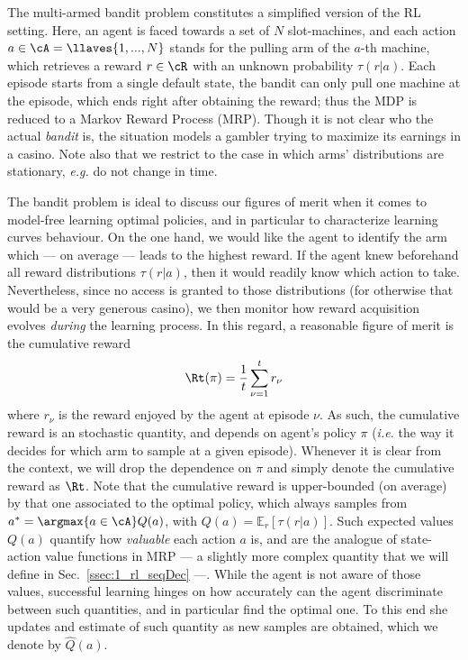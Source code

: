 The multi-armed bandit problem constitutes a simplified version of the RL setting. Here, an agent is faced towards a set of $N$ slot-machines, and each action $a \in \cA= \llaves{1,...,N}$ stands for the pulling arm of the $a$-th machine, which retrieves a reward $r \in \cR$ with an unknown probability $\tau(r|a)$. Each episode starts from a single default state, the bandit can only pull one machine at the episode, which ends right after obtaining the reward; thus the MDP is reduced to a Markov Reward Process (MRP). Though it is not clear who the actual \textit{bandit} is, the situation models a gambler trying to maximize its earnings in a casino. Note also that we restrict to the case in which arms' distributions are stationary, \textit{e.g.} do not change in time.

The bandit problem is ideal to discuss our figures of merit when it comes to model-free learning optimal policies, and in particular to characterize learning curves behaviour. On the one hand, we would like the agent to identify the arm which --- on average --- leads to the highest reward. If the agent knew beforehand all reward distributions $\tau(r|a)$, then it would readily know which action to take. Nevertheless, since no access is granted to those distributions (for otherwise that would be a very generous casino), we then monitor how reward acquisition evolves \textit{during} the learning process. In this regard, a reasonable figure of merit is the cumulative reward
\begin{align}
\Rt(\pi) = \frac{1}{t}\sum_{\nu=1}^t r_\nu
\end{align}
where $r_\nu$ is the reward enjoyed by the agent at episode $\nu$. As such, the cumulative reward is an stochastic quantity, and depends on agent's policy $\pi$ (\textit{i.e.} the way it decides for which arm to sample at a given episode). Whenever it is clear from the context, we will drop the dependence on $\pi$ and simply denote the cumulative reward as $\Rt$. Note that the cumulative reward is upper-bounded (on average) by that one associated to the optimal policy, which always samples from $a^* = \argmax{a\in\cA}Q(a)$, with $Q(a) = \mathbb{E}_r[\tau(r|a)]$. Such expected values $Q(a)$ quantify how \textit{valuable} each action $a$ is, and are the analogue of state-action value functions in MRP --- a slightly more complex quantity that we will define in Sec.~\ref{ssec:1_rl_seqDec} ---. While the agent is not aware of those values, successful learning hinges on how accurately can the agent discriminate between such quantities, and in particular find the optimal one. To this end she updates and estimate of such quantity as new samples are obtained, which we denote by $\hat{Q}(a)$.
